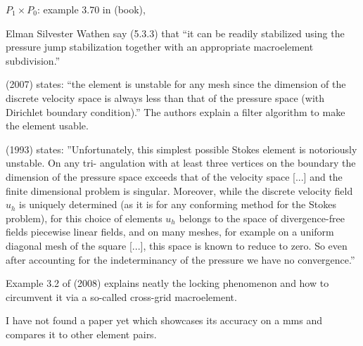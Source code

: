 
$P_1\times P_0$: example 3.70 in \textcite{john16} (book),


Elman Silvester Wathen say (5.3.3) that 
``it can be readily stabilized using the pressure jump
stabilization together with an appropriate macroelement subdivision.'' 

\textcite{qizh07b} (2007) states: ``the element is unstable for any mesh since
the dimension of the discrete velocity space is always less than that of the pressure space (with
Dirichlet boundary condition).'' The authors explain a filter algorithm to make the
element usable. 

\textcite{arno93} (1993) states: ''Unfortunately, this simplest possible Stokes element is notoriously unstable. On any tri-
angulation with at least three vertices on the boundary the dimension of the pressure
space exceeds that of the velocity space [...] and the finite
dimensional problem is singular. 
Moreover, while the discrete velocity field $u_h$ is uniquely
determined (as it is for any conforming method for the Stokes problem), for this choice of
elements $u_h$ belongs to the space of divergence-free fields piecewise linear fields, and on
many meshes, for example on a uniform diagonal mesh of the square [...],
this space is known to reduce to zero. So even after accounting for the indeterminancy of
the pressure we have no convergence.''

Example 3.2 of \textcite{bobf08} (2008) explains neatly the locking phenomenon and how 
to circumvent it via a so-called cross-grid macroelement.

I have not found a paper yet which showcases its accuracy on a mms and compares it to other 
element pairs.


